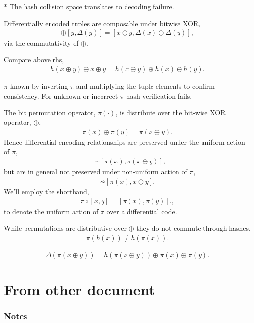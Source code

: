 \documentclass[twocolumn, aps, amsmath, amssymb, nofootinbib, superscriptaddress, longbibliography, doublefloatfix, table-of-contents, eqsecnum, rmp]{revtex4-2}
\begin{document}
* The hash collision space translates to decoding failure.

Differentially encoded tuples are composable under bitwise XOR,
\begin{align}
	[x,\Delta(x)] \oplus [y,\Delta(y)] = [x\oplus y, \Delta(x)\oplus \Delta(y)],
\end{align}
via the commutativity of $\oplus$.

Compare above rhs,
\begin{align}
	h(x\oplus y) \oplus x \oplus y = h(x \oplus y) \oplus h(x) \oplus h(y).
\end{align}

$\pi$ known by inverting $\pi$ and multiplying the tuple elements to confirm consistency. For unknown or incorrect $\pi$ hash verification fails.

The bit permutation operator, $\pi(\cdot)$, is distribute over the bit-wise XOR operator, $\oplus$,
\begin{align}
	\pi(x)\oplus \pi(y) = \pi(x\oplus y).
\end{align}
Hence differential encoding relationships are preserved under the uniform action of $\pi$,
\begin{align}
	[x,x\oplus y] &\sim [\pi(x), \pi(x\oplus y)],
\end{align}
but are in general not preserved under non-uniform action of $\pi$,
\begin{align}
	[x,x\oplus y] \not\sim [\pi(x), x\oplus y].
\end{align}
We'll employ the shorthand,
\begin{align}
	\pi\circ[x,y] = [\pi(x),\pi(y)].,
\end{align}
to denote the uniform action of $\pi$ over a differential code.

While permutations are distributive over $\oplus$ they do not commute through hashes,
\begin{align}
	\pi(h(x)) \neq h(\pi(x)).	
\end{align}

\begin{align}
	\Delta(\pi(x\oplus y)) = h(\pi(x\oplus y)) \oplus \pi(x) \oplus \pi(y).
\end{align}

\section{From other document}

\subsubsection{Notes}
\end{document}
